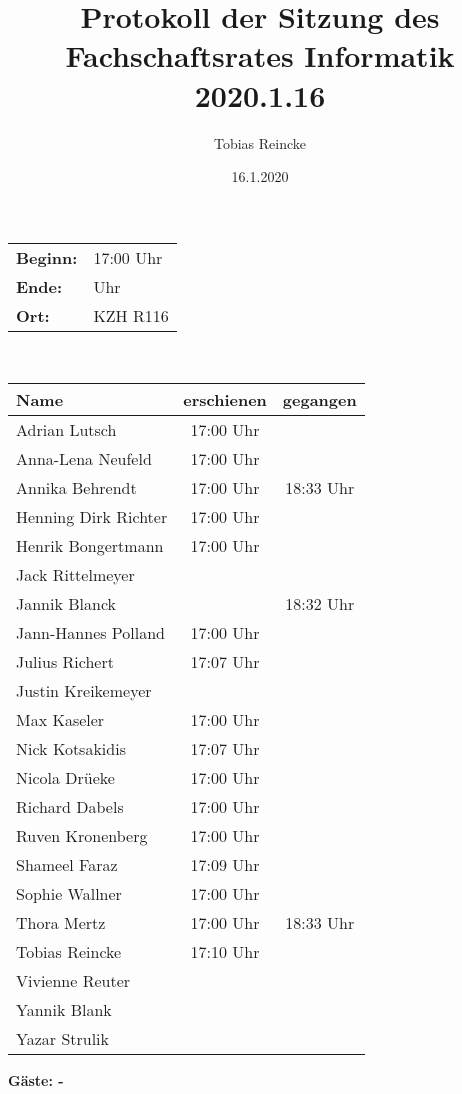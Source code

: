\documentclass[]{article}
\title{Protokoll der Sitzung des Fachschaftsrates Informatik 2020.1.16}
\author{Tobias Reincke}
\date{16.1.2020}
\begin{document}
\maketitle
\tableofcontents

\setlength{\parindent}{0pt} 

\addtolength{\textwidth}{1.0in}
\addtolength{\textheight}{1.00in}
\addtolength{\evensidemargin}{-0.75in}
\addtolength{\oddsidemargin}{-0.75in}
\addtolength{\topmargin}{-.50in}

\section{}
\begin{tabular}{l l}
	\textbf{Beginn:} & 17:00 Uhr\\
	\textbf{Ende:} & Uhr\\
	\textbf{Ort:} & KZH R116\\
\end{tabular}\\
\begin{table}[h]
	\centering
	\begin{tabular}{|l|c|c|}
		\hline
		Name & erschienen & gegangen \\
		\hline
		Adrian Lutsch        & 17:00 Uhr &  \\
		Anna-Lena Neufeld    & 17:00 Uhr & \\
		Annika Behrendt      & 17:00 Uhr & 18:33 Uhr \\
		Henning Dirk Richter &17:00 Uhr & \\
		Henrik Bongertmann   & 17:00 Uhr & \\
		Jack Rittelmeyer     & & \\
		Jannik Blanck &  & 18:32 Uhr\\
		Jann-Hannes Polland  & 17:00 Uhr &  \\
		
		
		Julius Richert       & 17:07 Uhr & \\
		Justin Kreikemeyer   & & \\
		Max Kaseler          & 17:00 Uhr & \\
		Nick Kotsakidis      & 17:07 Uhr & \\
		Nicola Drüeke        & 17:00 Uhr & \\
		Richard Dabels       & 17:00 Uhr & \\
		Ruven Kronenberg     & 17:00 Uhr & \\
		Shameel Faraz        & 17:09 Uhr & \\
		Sophie Wallner       & 17:00 Uhr & \\
		Thora Mertz          & 17:00 Uhr & 18:33 Uhr \\
		Tobias Reincke       & 17:10 Uhr & \\
		Vivienne Reuter      & & \\
		Yannik Blank         & & \\
		Yazar Strulik        & & \\
		\hline
	\end{tabular}
\end{table}
\textbf{Gäste: -}
\end{document}
